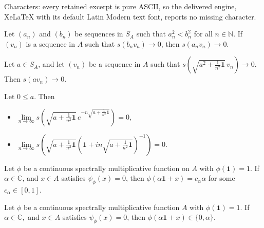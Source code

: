 \documentclass[10pt,a4paper]{amsart}
\newcommand{\field}{\mathbb{C}}
\newcommand{\identity}{\mathbf{1}}
\begin{document}
Characters: every retained excerpt is pure ASCII, so the delivered engine, XeLaTeX with its default Latin Modern text font, reports no missing character.
	\begin{lemma}\label{lem:1}
		Let $\left(a_n\right)$ and $\left(b_n\right)$ be sequences in $S_A$ such that $a_n^2 < b_n^2$ for all $n\in \mathbb{N}$. If $\left(v_n\right)$ is a sequence in $A$ such that $s(b_nv_n)\to 0$, then $s(a_nv_n)\to 0$.
	\end{lemma}

	\begin{lemma}\label{lem:2}
			Let $a\in S_A$, and let $(v_n)$ be a sequence in $A$ such that $s\left(\sqrt{a^2+\frac{1}{n^2}\mathbf 1}\, v_n\right)\to 0$. Then $s(av_n)\to 0$.
	\end{lemma}

	\begin{lemma}\label{lem:3}
		Let $0\leq a$. Then 
		\begin{itemize}
		\item[\rm (a)] $\lim\limits_{n\to\infty}s\left(\sqrt{a+\frac{1}{n^2}\mathbf 1}\,e^{-n\sqrt{a+\frac{1}{n^2}\mathbf 1}}\right)=0,$
		\item[\rm (b)]
		$\lim\limits_{n\to\infty}s \left(\sqrt{a+\frac{1}{n^2}\mathbf 1}\left(\identity+in\sqrt{a+\frac{1}{n^2}\mathbf 1}\right)^{-1}\right)=0.$
		\end{itemize}
	\end{lemma}

 	\begin{lemma}\label{lem:5}
 		Let $\phi$ be a continuous spectrally multiplicative function on $A$ with $\phi(\identity)=1$. If $\alpha\in\field$, and $x\in A$ satisfies $\psi_\phi(x)=0$, then $\phi(\alpha\identity+x)=c_\alpha \alpha$ for some $c_\alpha\in [0,1]$.
 	\end{lemma}

  	\begin{lemma}\label{no_zero}
  		Let  $\phi$ be a 
  		continuous   spectrally multiplicative  function $A$ with $\phi(\identity)=1$. If $\alpha \in \mathbb{C},$ and  $x\in A$  satisfies $\psi_\phi(x)=0 $, then $\phi(\alpha\mathbf{1}+ x)\in\{ 0,\alpha  \}.$
  	\end{lemma}
\end{document}
